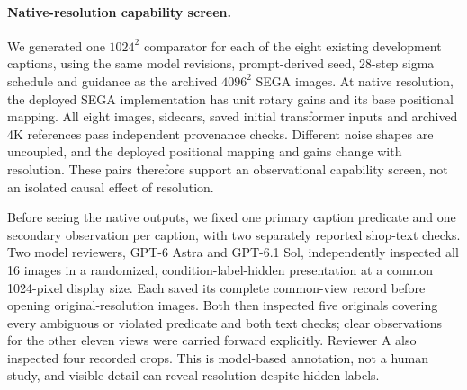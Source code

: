 \paragraph{Native-resolution capability screen.}
We generated one $1024^2$ comparator for each of the eight existing development
captions, using the same model revisions, prompt-derived seed, 28-step sigma
schedule and guidance as the archived $4096^2$ SEGA images. At native resolution,
the deployed SEGA implementation has unit rotary gains and its base positional
mapping. All eight images, sidecars, saved initial transformer inputs and archived
4K references pass independent provenance checks. Different noise shapes are
uncoupled, and the deployed positional mapping and gains change with resolution.
These pairs therefore support an observational capability screen, not an isolated
causal effect of resolution.

Before seeing the native outputs, we fixed one primary caption predicate and
one secondary observation per caption, with two separately reported shop-text
checks. Two model reviewers, GPT-6 Astra and GPT-6.1 Sol, independently inspected
all 16 images in a randomized, condition-label-hidden presentation at a common
1024-pixel display size. Each saved its complete common-view record before
opening original-resolution images. Both then inspected five originals covering
every ambiguous or violated predicate and both text checks; clear observations
for the other eleven views were carried forward explicitly. Reviewer A also
inspected four recorded crops. This is model-based annotation, not a human
study, and visible detail can reveal resolution despite hidden labels.

